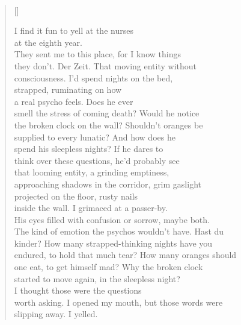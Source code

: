 \documentclass{book}
\begin{document}
\newpage
\poemtitle{\textcolor[RGB]{175,25,25}{His mind at the clockwork}}
\hspace*{\fill} \\
\settowidth{\versewidth}{endured, to hold that much tear? How many oranges should}
\begin{verse}[\versewidth]

    I find it fun to yell at the nurses\\
    at the eighth year. \\
    They sent me to this place, for I know things\\
    they don't. Der Zeit. That moving entity without\\
    consciousness. I'd spend nights on the bed,\\
    strapped, ruminating on how\\
    a real psycho feels. Does he ever \\
    smell the stress of coming death? Would he notice \\
    the broken clock on the wall? Shouldn't oranges be\\
    supplied to every lunatic? And how does he\\
    spend his sleepless nights? If he dares to \\
    think over these questions, he'd probably see \\
    that looming entity, a grinding emptiness, \\
    approaching shadows in the corridor, grim gaslight\\
    projected on the floor, rusty nails \\
    inside the wall. I grimaced at a passer-by. \\
    His eyes filled with confusion or sorrow, maybe both. \\
    The kind of emotion the psychos wouldn't have. Hast du\\
    kinder? How many strapped-thinking nights have you\\
    endured, to hold that much tear? How many oranges should\\
    one eat, to get himself mad? Why the broken clock\\
    started to move again, in the sleepless night?\\
     I thought those were the questions\\
    worth asking. I opened my mouth, but those words were\\
    slipping away. I yelled.
\end{verse}

\newpage
\begin{coverpage}
    \thispagestyle{empty}
    \noindent\fboxsep=0pt
\end{coverpage}
\end{document}
